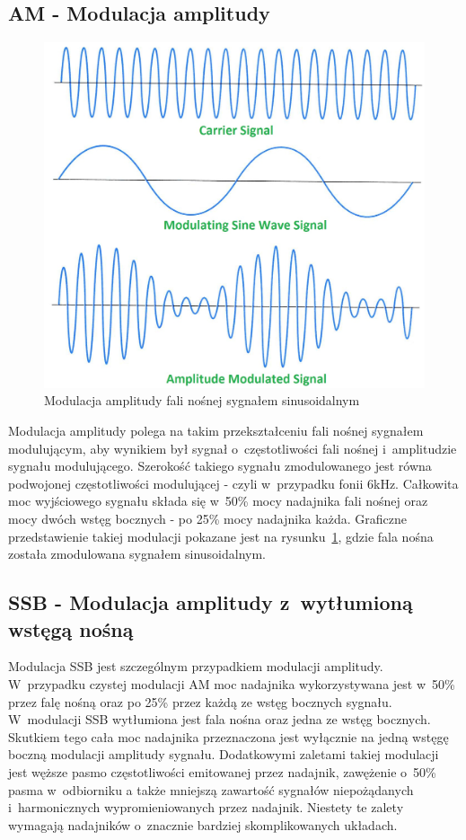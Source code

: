 \documentclass[eng,oneside]{mgr}
\begin{document}
			\subsection{AM - Modulacja amplitudy}
			\begin{figure}[!htb]
				\begin{center}
					\includegraphics[scale=0.8]{modulacja_am}
				\end{center}
				\caption{Modulacja amplitudy fali nośnej sygnałem sinusoidalnym}
				\label{fig:am_modulation}
			\end{figure}
			Modulacja amplitudy polega na takim przekształceniu fali nośnej sygnałem modulującym, aby wynikiem był sygnał o~częstotliwości fali nośnej i~amplitudzie sygnału modulującego. Szerokość takiego sygnału zmodulowanego jest równa podwojonej częstotliwości modulującej - czyli w~przypadku fonii 6kHz. Całkowita moc wyjściowego sygnału składa się w~50\% mocy nadajnika fali nośnej oraz mocy dwóch wstęg bocznych - po 25\% mocy nadajnika każda. Graficzne przedstawienie takiej modulacji pokazane jest na rysunku~\ref{fig:am_modulation}, gdzie fala nośna została zmodulowana sygnałem sinusoidalnym. 

			\subsection{SSB - Modulacja amplitudy z~wytłumioną wstęgą nośną}
			Modulacja SSB jest szczególnym przypadkiem modulacji amplitudy. W~przypadku czystej modulacji AM moc nadajnika wykorzystywana jest w~50\% przez falę nośną oraz po 25\% przez każdą ze wstęg bocznych sygnału. W~modulacji SSB wytłumiona jest fala nośna oraz jedna ze wstęg bocznych. Skutkiem tego cała moc nadajnika przeznaczona jest wyłącznie na jedną wstęgę boczną modulacji amplitudy sygnału. Dodatkowymi zaletami takiej modulacji jest węższe pasmo częstotliwości emitowanej przez nadajnik, zawężenie o~50\% pasma w~odbiorniku a także mniejszą zawartość sygnałów niepożądanych i~harmonicznych wypromieniowanych przez nadajnik. Niestety te zalety wymagają nadajników o~znacznie bardziej skomplikowanych układach. 
\end{document}
